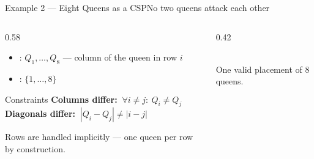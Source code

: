\documentclass[aspectratio=169,11pt]{beamer}
\begin{document}
\begin{frame}{Example 2 — Eight Queens as a CSP}{No two queens attack each other}
  \begin{columns}[T]
    \begin{column}{0.58\textwidth}
      \begin{itemize}\small
        \item {}: $Q_1,\dots,Q_8$ — column of the queen in row $i$
        \item {}: $\{1,\dots,8\}$
      \end{itemize}
      \begin{block}{Constraints}
        \small
        \textbf{Columns differ:} $\ \forall i\neq j:\ Q_i \neq Q_j$ \\[0.3em]
        \textbf{Diagonals differ:} $\ |Q_i - Q_j| \neq |i - j|$
      \end{block}
      \centering\scriptsize
      Rows are handled implicitly — one queen per row by construction.
    \end{column}
    \begin{column}{0.42\textwidth}
      \begin{center}
      \\[0.3em]
      \scriptsize One valid placement of 8 queens.
      \end{center}
    \end{column}
  \end{columns}
\end{frame}
\end{document}
